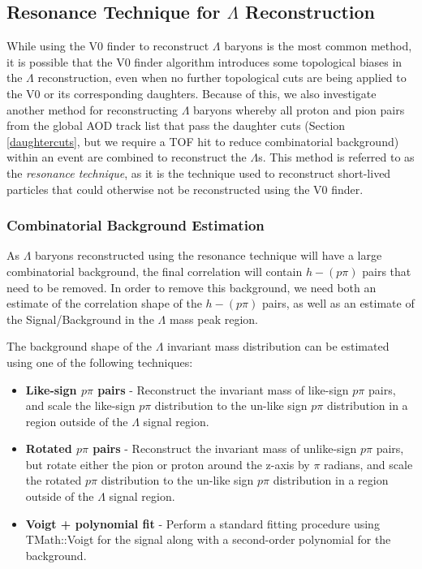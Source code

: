 \documentclass[ALICE,manyauthors]{ALICE_analysis_notes}
\begin{document}
\subsection{Resonance Technique for $\Lambda$ Reconstruction}
\label{resonance_technique}

While using the V0 finder to reconstruct $\Lambda$ baryons is the most common method, it is possible that the V0 finder algorithm introduces some topological biases in the $\Lambda$ reconstruction, even when no further topological cuts are being applied to the V0 or its corresponding daughters. Because of this, we also investigate another method for reconstructing $\Lambda$ baryons whereby all proton and pion pairs from the global AOD track list that pass the daughter cuts (Section \ref{daughtercuts}, but we require a TOF hit to reduce combinatorial background) within an event are combined to reconstruct the $\Lambda$s. This method is referred to as the \textit{resonance technique}, as it is the technique used to reconstruct short-lived particles that could otherwise not be reconstructed using the V0 finder.

\subsubsection{Combinatorial Background Estimation}
\label{combinatorial_background}

As $\Lambda$ baryons reconstructed using the resonance technique will have a large combinatorial background, the final correlation will contain $h-(p\pi)$ pairs that need to be removed. In order to remove this background, we need both an estimate of the correlation shape of the $h-(p\pi)$ pairs, as well as an estimate of the Signal/Background in the $\Lambda$ mass peak region.

 The background shape of the $\Lambda$ invariant mass distribution can be estimated using one of the following techniques:

 \begin{itemize}
	\item \textbf{Like-sign $p\pi$ pairs} - Reconstruct the invariant mass of like-sign $p\pi$ pairs, and scale the like-sign $p\pi$ distribution to the un-like sign $p\pi$ distribution in a region outside of the $\Lambda$ signal region.
	\item \textbf{Rotated $p\pi$ pairs} - Reconstruct the invariant mass of unlike-sign $p\pi$ pairs, but rotate either the pion or proton around the z-axis by $\pi$ radians, and scale the rotated $p\pi$ distribution to the un-like sign $p\pi$ distribution in a region outside of the $\Lambda$ signal region.
	\item \textbf{Voigt + polynomial fit} - Perform a standard fitting procedure using TMath::Voigt for the signal along with a second-order polynomial for the background.
 \end{itemize}
\end{document}
